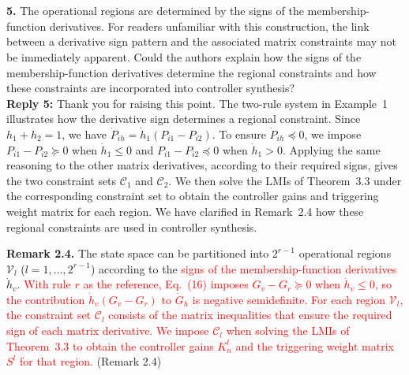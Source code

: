 \documentclass[10pt,fleqn]{article}
\begin{document}
~\\
\\
\textbf{5.} The operational regions are determined by the signs of the membership-function derivatives. For readers unfamiliar with this construction, the link between a derivative sign pattern and the associated matrix constraints may not be immediately apparent. Could the authors explain how the signs of the membership-function derivatives determine the regional constraints and how these constraints are incorporated into controller synthesis? 
\\[10pt]
\begingroup
\setlength{\parskip}{6pt}
\indent \textbf{Reply 5:} Thank you for raising this point. The two-rule system in Example~1 illustrates how the derivative sign determines a regional constraint. Since $h_1+h_2=1$, we have $\dot P_{ih}=\dot h_1(P_{i1}-P_{i2})$. To ensure $\dot P_{ih}\preceq 0$, we impose $P_{i1}-P_{i2}\succeq 0$ when $\dot h_1\leq 0$ and $P_{i1}-P_{i2}\preceq 0$ when $\dot h_1>0$. Applying the same reasoning to the other matrix derivatives, according to their required signs, gives the two constraint sets $\mathcal C_1$ and $\mathcal C_2$. We then solve the LMIs of Theorem~3.3 under the corresponding constraint set to obtain the controller gains and triggering weight matrix for each region. We have clarified in Remark~2.4 how these regional constraints are used in controller synthesis.\par
\noindent \textbf{Remark 2.4.} The state space can be partitioned into $2^{r-1}$ operational regions $\mathcal{V}_l$ ($l = 1,\ldots,2^{r-1}$) according to the \textcolor{red}{signs of the membership-function derivatives} $\dot{h}_v$. \textcolor{red}{With rule $r$ as the reference, Eq.~(16) imposes $G_v-G_r\succeq 0$ when $\dot h_v\leq 0$, so the contribution $\dot h_v(G_v-G_r)$ to $\dot G_h$ is negative semidefinite. For each region $\mathcal V_l$, the constraint set $\mathcal C_l$ consists of the matrix inequalities that ensure the required sign of each matrix derivative. We impose $\mathcal C_l$ when solving the LMIs of Theorem~3.3 to obtain the controller gains $K_n^l$ and the triggering weight matrix $S^l$ for that region.} (Remark 2.4)\par
\endgroup
%
\end{document}
